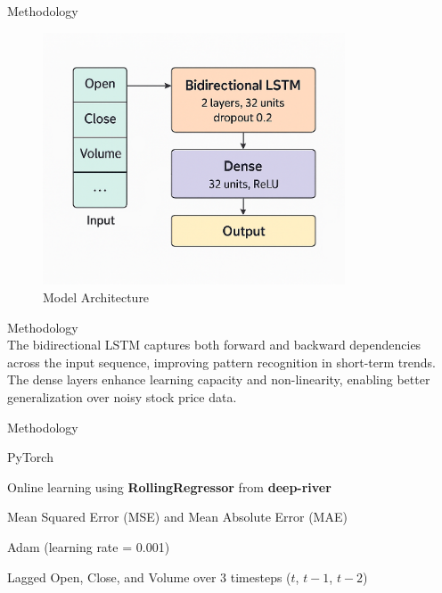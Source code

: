 \documentclass[9pt]{beamer}
\begin{document}
\begin{frame}{Methodology}
    \begin{figure}[htbp]
        \centering
        \includegraphics[width=0.8\textwidth]{model3.png}
        \caption{Model Architecture}
    \end{figure}
\end{frame}

\begin{frame}{Methodology}
    \\[0.3cm]

    The bidirectional LSTM captures both forward and backward dependencies
    across
    the input sequence, improving pattern recognition in short-term trends. The
    dense layers enhance learning capacity and non-linearity, enabling better
    generalization over noisy stock price data.

\end{frame}

\begin{frame}{Methodology}
    \\[0.8cm]
    \begin{description}[leftmargin=3.5cm, style=nextline]
        \item[Framework:] PyTorch
        \item[Training Strategy:] Online learning using
            \textbf{RollingRegressor}
            from \textbf{deep-river}
        \item[Loss Function:] Mean Squared Error (MSE) and Mean Absolute Error
            (MAE)
        \item[Optimizer:] Adam (learning rate = 0.001)
        \item[Features:] Lagged Open, Close, and Volume over 3 timesteps ($t$,
            $t-1$, $t-2$)
    \end{description}

\end{frame}
\end{document}
